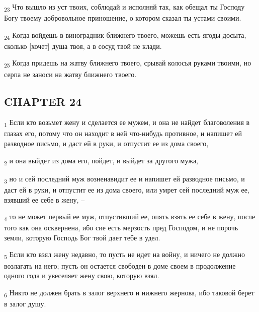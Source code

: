 \begin{tcolorbox}
\textsubscript{23} Что вышло из уст твоих, соблюдай и исполняй так, как обещал ты Господу Богу твоему добровольное приношение, о котором сказал ты устами своими.
\end{tcolorbox}
\begin{tcolorbox}
\textsubscript{24} Когда войдешь в виноградник ближнего твоего, можешь есть ягоды досыта, сколько [хочет] душа твоя, а в сосуд твой не клади.
\end{tcolorbox}
\begin{tcolorbox}
\textsubscript{25} Когда придешь на жатву ближнего твоего, срывай колосья руками твоими, но серпа не заноси на жатву ближнего твоего.
\end{tcolorbox}
\subsection{CHAPTER 24}
\begin{tcolorbox}
\textsubscript{1} Если кто возьмет жену и сделается ее мужем, и она не найдет благоволения в глазах его, потому что он находит в ней что-нибудь противное, и напишет ей разводное письмо, и даст ей в руки, и отпустит ее из дома своего,
\end{tcolorbox}
\begin{tcolorbox}
\textsubscript{2} и она выйдет из дома его, пойдет, и выйдет за другого мужа,
\end{tcolorbox}
\begin{tcolorbox}
\textsubscript{3} но и сей последний муж возненавидит ее и напишет ей разводное письмо, и даст ей в руки, и отпустит ее из дома своего, или умрет сей последний муж ее, взявший ее себе в жену, --
\end{tcolorbox}
\begin{tcolorbox}
\textsubscript{4} то не может первый ее муж, отпустивший ее, опять взять ее себе в жену, после того как она осквернена, ибо сие есть мерзость пред Господом, и не порочь земли, которую Господь Бог твой дает тебе в удел.
\end{tcolorbox}
\begin{tcolorbox}
\textsubscript{5} Если кто взял жену недавно, то пусть не идет на войну, и ничего не должно возлагать на него; пусть он остается свободен в доме своем в продолжение одного года и увеселяет жену свою, которую взял.
\end{tcolorbox}
\begin{tcolorbox}
\textsubscript{6} Никто не должен брать в залог верхнего и нижнего жернова, ибо таковой берет в залог душу.
\end{tcolorbox}
